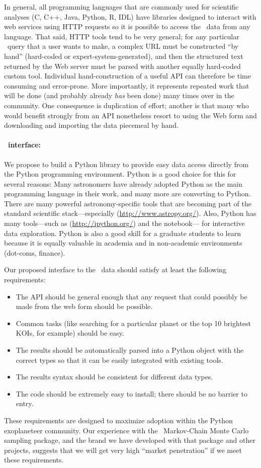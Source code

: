 \documentclass[letterpaper,12pt,preprint]{hack_aastex}
\newcommand{\hurl}[1]{{\scriptsize\url{#1}}}
\newcommand{\kplr}{\package{kplr}}
\newcommand{\emcee}{\package{emcee}}
\begin{document}
In general, all programming languages that are commonly used for scientific
analyses (C, C++, Java, Python, R, IDL) have
libraries designed to interact with web services using HTTP requests so it is
possible to access the \Kepler\ data from any language.
That said, HTTP tools tend to be very general;
for any particular \Kepler\ query that a user wants to make,
a complex URL must be constructed ``by hand'' (hard-coded or
expert-system-generated), and then the structured text returned by the Web server must be
parsed with another equally hard-coded custom tool.
Individual hand-construction of a useful API can therefore
be time consuming and error-prone.
More importantly, it represents repeated work that will be done (and probably
already \emph{has} been done) many times over in the community.
One consequence is duplication of effort; another is that many who would
benefit strongly from an API nonetheless resort to using the Web form
and downloading and importing the data piecemeal by hand.

\paragraph{\kplr\ interface:}
We propose to build a Python library to provide easy data access directly
from the Python programming environment.
Python is a good choice for this for several reasons:
Many astronomers have already adopted Python as the main
programming language in their work, and many more are
converting to Python.
There are many powerful astronomy-specific tools that are becoming part of
the standard scientific stack---especially 
 (\hurl{http://www.astropy.org/}).
Also, Python has many tools---such as 
 (\hurl{http://ipython.org/}) and the  notebook---%
for interactive data exploration.
Python is also a good skill for a graduate students to learn
because it is equally valuable in academia and in non-academic
environments (dot-coms, finance).

Our proposed interface to the \Kepler\ data should satisfy at least the
following requirements:
\begin{itemize}
\item The API should be general enough that any request that could
possibly be made from the web form should be possible.
\item Common tasks (like searching for a particular planet or the top 10
brightest KOIs, for example) should be easy.
\item The results should be automatically parsed into a Python object with the
correct types so that it can be easily integrated with existing tools.
\item The results syntax should be consistent for different data types.
\item The code should be extremely easy to install; there should be no
barrier to entry.
\end{itemize}
These requirements are designed to maximize adoption within the Python
exoplaneteer community.
Our experience with the \emcee\ Markov-Chain Monte Carlo sampling package,
and the brand we have developed with that package and other projects,
suggests that we will get very high ``market penetration'' if we meet these
requirements.
\end{document}

